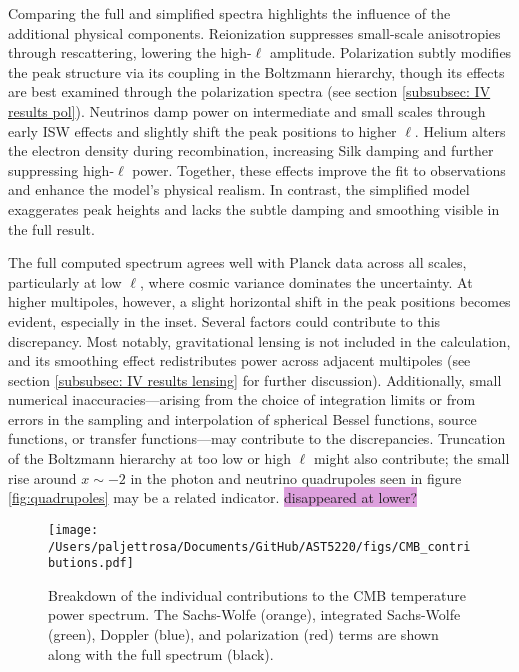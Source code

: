 \documentclass{aa}
\numberwithin{equation}{section}
\numberwithin{table}{section}
\numberwithin{figure}{section}
\begin{document}
Comparing the full and simplified spectra highlights the influence of the additional physical components. Reionization suppresses small-scale anisotropies through rescattering, lowering the high-$\ell$ amplitude. Polarization subtly modifies the peak structure via its coupling in the Boltzmann hierarchy, though its effects are best examined through the polarization spectra (see section \ref{subsubsec: IV results pol}). Neutrinos damp power on intermediate and small scales through early ISW effects and slightly shift the peak positions to higher $\ell$. Helium alters the electron density during recombination, increasing Silk damping and further suppressing high-$\ell$ power. Together, these effects improve the fit to observations and enhance the model's physical realism. In contrast, the simplified model exaggerates peak heights and lacks the subtle damping and smoothing visible in the full result.

The full computed spectrum agrees well with Planck data across all scales, particularly at low $\ell$, where cosmic variance dominates the uncertainty. At higher multipoles, however, a slight horizontal shift in the peak positions becomes evident, especially in the inset. Several factors could contribute to this discrepancy. Most notably, gravitational lensing is not included in the calculation, and its smoothing effect redistributes power across adjacent multipoles (see section \ref{subsubsec: IV results lensing} for further discussion). Additionally, small numerical inaccuracies—arising from the choice of integration limits or from errors in the sampling and interpolation of spherical Bessel functions, source functions, or transfer functions—may contribute to the discrepancies.
Truncation of the Boltzmann hierarchy at too low or high $\ell$ might also contribute; the small rise around $x \sim -2$ in the photon and neutrino quadrupoles seen in figure \ref{fig:quadrupoles} may be a related indicator. \colorbox{Plum}{disappeared at lower?}


\begin{figure}
  \centering
  \texttt{[image: /Users/paljettrosa/Documents/GitHub/AST5220/figs/CMB\_contributions.pdf]}
  \caption{Breakdown of the individual contributions to the CMB temperature power spectrum. The Sachs-Wolfe (orange), integrated Sachs-Wolfe (green), Doppler (blue), and polarization (red) terms are shown along with the full spectrum (black).}
  \label{fig:CMB contributions}
\end{figure}
\end{document}

